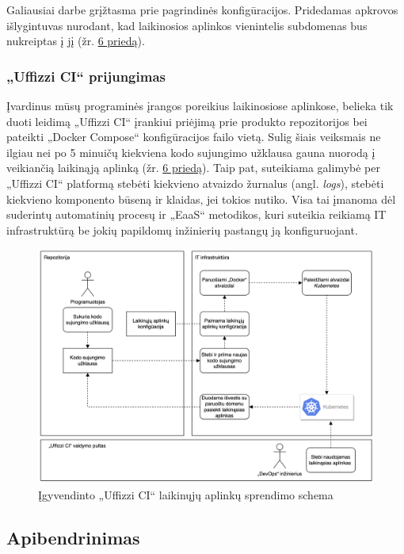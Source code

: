 \documentclass{VUMIFPSkursinis}
\begin{document}
Galiausiai darbe grįžtasma prie pagrindinės konfigūracijos. Pridedamas apkrovos išlygintuvas nurodant, kad laikinosios aplinkos vienintelis subdomenas bus nukreiptas į jį (žr. \hyperref[priedas6]{6 priedą}).

    \subsubsection{„Uffizzi CI“ prijungimas}

Įvardinus mūsų programinės įrangos poreikius laikinosiose aplinkose, belieka tik duoti leidimą „Uffizzi CI“ įrankiui priėjimą prie produkto repozitorijos bei pateikti „Docker Compose“ konfigūracijos failo vietą. Sulig šiais veiksmais ne ilgiau nei po 5 minuičų kiekviena kodo sujungimo užklausa gauna nuorodą į veikiančią laikinąją aplinką (žr. \hyperref[priedas6]{6 priedą}). Taip pat, suteikiama galimybė per „Uffizzi CI“ platformą stebėti kiekvieno atvaizdo žurnalus (angl. \textit{logs}), stebėti kiekvieno komponento būseną ir klaidas, jei tokios nutiko. Visa tai įmanoma dėl suderintų automatinių procesų ir „EaaS“ metodikos, kuri suteikia reikiamą IT infrastruktūrą be jokių papildomų inžinierių pastangų ją konfiguruojant.

\begin{figure}[H]
    \centering
    \includegraphics[scale=0.28]{img/UffizziFixed.png}
    \caption{Įgyvendinto „Uffizzi CI“ laikinųjų aplinkų sprendimo schema}
    \label{img:mlp}
\end{figure}

\subsection{Apibendrinimas}
\end{document}
